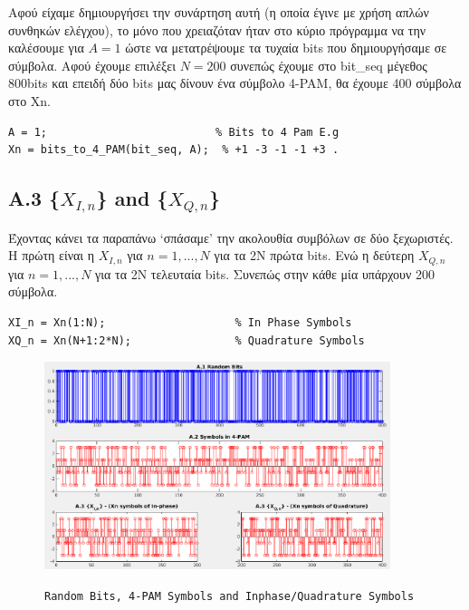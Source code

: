 \documentclass[11pt]{article}
\begin{document}
    \par \noindent
    Αφού είχαμε δημιουργήσει την συνάρτηση αυτή (η οποία έγινε με χρήση απλών συνθηκών ελέγχου), το μόνο που χρειαζόταν ήταν στο κύριο πρόγραμμα να την καλέσουμε για $Α=1$ ώστε να μετατρέψουμε τα τυχαία bits που δημιουργήσαμε σε σύμβολα. 
    Αφού έχουμε επιλέξει $Ν=200$ συνεπώς έχουμε στο bit\_seq μέγεθος 800bits και επειδή δύο bits μας δίνουν ένα σύμβολο 4-PAM, θα έχουμε 400 σύμβολα στο Xn.
    
    \begin{lstlisting}[caption = {A.2 \texttt{Convert bits to symbols}}]
% A.2
A = 1;                          % Bits to 4 Pam E.g
Xn = bits_to_4_PAM(bit_seq, A);  % +1 -3 -1 -1 +3 . 
    \end{lstlisting}
    
    \subsection*{A.3 \{$X_{I,n}$\} and \{$X_{Q,n}$\} }
    Έχοντας κάνει τα παραπάνω `σπάσαμε' την ακολουθία συμβόλων σε δύο ξεχωριστές. 
    Η πρώτη είναι η $X_{I,n}$ για $n=1, ..., N$ για τα 2Ν πρώτα bits. 
    Ενώ η δεύτερη $X_{Q,n}$ για $n=1, ..., N$ για τα 2Ν τελευταία bits. 
    Συνεπώς στην κάθε μία υπάρχουν 200 σύμβολα.
    
    
    \begin{lstlisting}[caption = {A.3 \texttt{Split Symbols}}]
% A.3
XI_n = Xn(1:N);                    % In Phase Symbols
XQ_n = Xn(N+1:2*N);                % Quadrature Symbols
    \end{lstlisting}
    
    
     \begin{figure}[H]
        \centering
        \includegraphics[scale=0.5, width=0.9\textwidth]{img/A1_A3.png} \\
        \caption{\texttt{Random Bits, 4-PAM Symbols and Inphase/Quadrature Symbols}}
    \end{figure}
    
\end{document}
